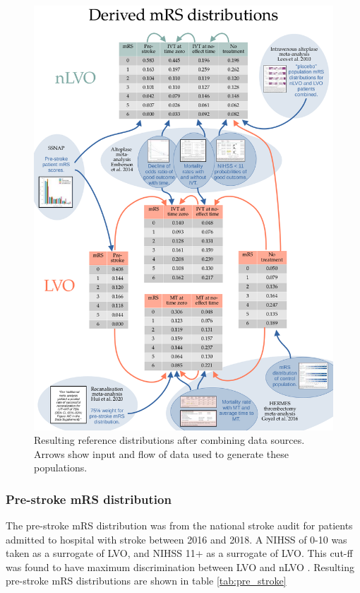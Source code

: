 \begin{figure}[h!]
    \centering
    \includegraphics[width=1.0\linewidth]{images_modelling/data_sources_summary.png}
    \caption{Resulting reference distributions after combining data sources. Arrows show input and flow of data used to generate these populations.}
    \label{fig:data_sources_summary}
\end{figure}

\subsubsection{Pre-stroke mRS distribution}

The pre-stroke mRS distribution was from the national stroke audit for patients admitted to hospital with stroke between 2016 and 2018. A NIHSS of 0-10 was taken as a surrogate of LVO, and NIHSS 11+ as a surrogate of LVO. This cut-ff was found to have maximum discrimination between LVO and nLVO \cite{perez_de_la_ossa_effect_2022}. Resulting pre-stroke mRS distributions are shown in table \ref{tab:pre_stroke}

